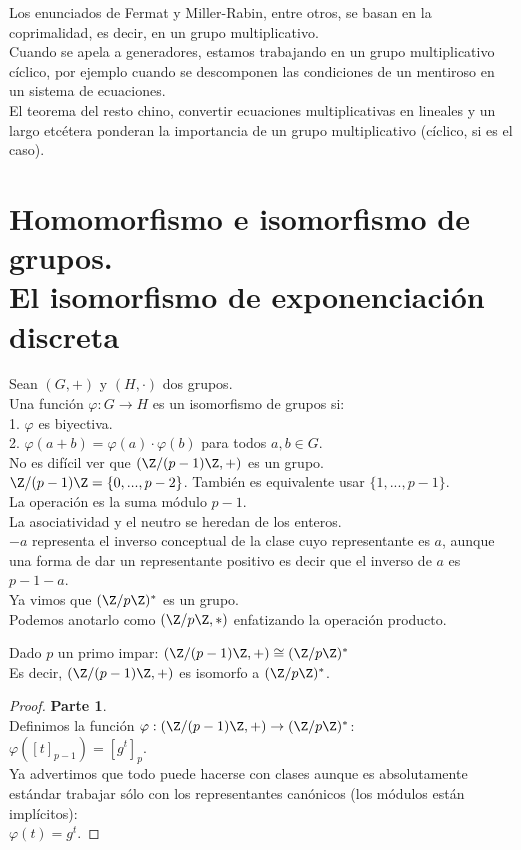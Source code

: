 Los enunciados de Fermat y Miller-Rabin, entre otros, se basan en la coprimalidad, es decir, en un grupo multiplicativo. \\
Cuando se apela a generadores, estamos trabajando en un grupo multiplicativo cíclico, por ejemplo cuando se descomponen las condiciones de un mentiroso en un sistema de ecuaciones. \\
El teorema del resto chino, convertir ecuaciones multiplicativas en lineales y un largo etcétera ponderan la importancia de un grupo multiplicativo (cíclico, si es el caso).

\section{Homomorfismo e isomorfismo de grupos. \\ 
El isomorfismo de exponenciación discreta}
Sean $(G,+)$ y $(H,\cdot)$ dos grupos. \\
Una función $\varphi:G\to H$ es un isomorfismo de grupos si: \\
1. $\varphi$ es biyectiva. \\
2. $\varphi(a+b)=\varphi(a)\cdot\varphi(b)$ para todos $a,b\in G$. \\

No es difícil ver que $(\Z/(p-1)\Z,+)$ es un grupo.\\
$\Z/(p-1)\Z = \{0,...,p-2\}$. También es equivalente usar $\{1,...,p-1\}$. \\
La operación es la suma módulo $p-1$. \\
La asociatividad y el neutro se heredan de los enteros. \\
$-a$ representa el inverso conceptual de la clase cuyo representante es $a$, aunque una forma de dar un representante positivo es decir que el inverso de $a$ es $p-1-a$.\\

Ya vimos que $(\Z/p\Z)^{*}$ es un grupo. \\
Podemos anotarlo como $(\Z/p\Z,*)$ enfatizando la operación producto.

\begin{enunciado} \label{enun:isoexpo}\leavevmode\par
Dado $p$ un primo impar: $(\Z/(p-1)\Z,+) \cong (\Z/p\Z)^{*}$ \\
Es decir, $(\Z/(p-1)\Z,+)$ es isomorfo a $(\Z/p\Z)^{*}$.
\end{enunciado}

\begin{proof} \textbf{Parte 1}. \\
Definimos la función $\varphi : (\Z/(p-1)\Z,+) \to (\Z/p\Z)^{*}$: \\
$\varphi ([t]_{p-1}) = [g^t]_p$. \\
Ya advertimos que todo puede hacerse con clases aunque es absolutamente estándar trabajar sólo con los representantes canónicos (los módulos están implícitos): \\
$\varphi (t) = g^t$. 
\end{proof}

